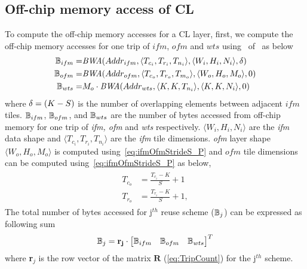 \subsection{Off-chip memory access of CL}\label{sec:AccessCLData}
To compute the off-chip memory accesses for a CL layer, first, we compute the off-chip memory accesses for one trip of $ifm$, $ofm$ and $wts$ using~ of~ as below
\begin{align*}
	\begin{split}
		\mathbb{B}_{ifm}=&\emph{BWA}(Addr_{ifm},\langle T_{c_i}, T_{r_i},T_{n_i}\rangle,\langle W_i,H_i,N_i\rangle,\delta)\\
		\mathbb{B}_{ofm}=&\emph{BWA}(Addr_{ofm},\langle T_{c_o},T_{r_o},T_{m_o}\rangle,\langle W_o,H_o,M_o\rangle,0)\\
		\mathbb{B}_{wts}=&M_o\cdot \emph{BWA}(Addr_{wts},\langle K,K,T_{n_i}\rangle,\langle K,K,N_i\rangle,0)
	\end{split}
\end{align*} 
where $\delta=(K-S)$ is the number of overlapping elements between adjacent $ifm$ tiles. $\mathbb{B}_{ifm}$, $\mathbb{B}_{ofm}$, and $\mathbb{B}_{wts}$ are the number of bytes accessed from off-chip memory for one trip of \textit{ifm, ofm} and \textit{wts} respectively. $\langle W_{i},H_{i},N_{i}\rangle$ are the \textit{ifm} data shape and $\langle T_{c_i},T_{r_i},T_{n_i}\rangle$ are the \textit{ifm} tile dimensions. \textit{ofm} layer shape $\langle W_{o},H_{o},M_{o}\rangle$ is computed using~\eqref{eq:ifmOfmStrideS_P} and $ofm$ tile dimensions can be computed using~\eqref{eq:ifmOfmStrideS_P} as below,
\begin{align}\label{eq:ofmAndifmTileDims}
	\begin{split}
		T_{c_o}&=\frac{T_{c_{i}}-K}{S}+1 \\
		T_{r_o}&=\frac{T_{r_{i}}-K}{S}+1,
	\end{split}
\end{align}  
The total number of bytes accessed for j$^{th}$ reuse scheme ($\mathbb{B}_j$) can be expressed as following sum
\begin{equation} \label{eq:TotalOffChipAccess}
	\mathbb{B}_j=\mathbf{r_j}\cdot \begin{bmatrix}
		\mathbb{B}_{ifm} &
		\mathbb{B}_{ofm} &
		\mathbb{B}_{wts}
	\end{bmatrix}^{T}
\end{equation}
where \textbf{r}$_j$ is the row vector of the matrix $\mathbf{R}$ (\eqref{eq:TripCount}) for the j$^{th}$ scheme. 
